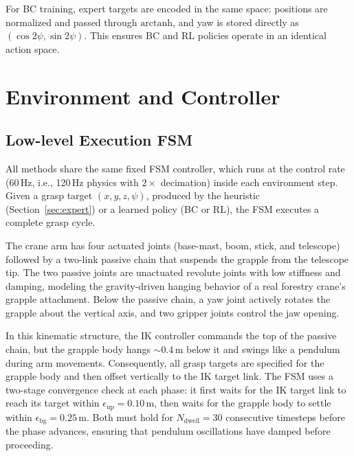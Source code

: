 \documentclass[conference]{IEEEtran}
\begin{document}
For BC training, expert targets are encoded in the same space: positions are normalized and passed through $\mathrm{arctanh}$, and yaw is stored directly as $(\cos 2\psi, \sin 2\psi)$.
This ensures BC and RL policies operate in an identical action space.

\section{Environment and Controller}
\subsection{Low-level Execution FSM}
All methods share the same fixed FSM controller, which runs at the control rate (60\,Hz, i.e., 120\,Hz physics with $2\times$ decimation) inside each environment step.
Given a grasp target $(x,y,z,\psi)$, produced by the heuristic (Section~\ref{sec:expert}) or a learned policy (BC or RL), the FSM executes a complete grasp cycle.

The crane arm has four actuated joints (base-mast, boom, stick, and telescope) followed by a two-link passive chain that suspends the grapple from the telescope tip.
The two passive joints are unactuated revolute joints with low stiffness and damping, modeling the gravity-driven hanging behavior of a real forestry crane's grapple attachment.
Below the passive chain, a yaw joint actively rotates the grapple about the vertical axis, and two gripper joints control the jaw opening.

In this kinematic structure, the IK controller commands the top of the passive chain, but the grapple body hangs $\sim$0.4\,m below it and swings like a pendulum during arm movements.
Consequently, all grasp targets are specified for the grapple body and then offset vertically to the IK target link.
The FSM uses a two-stage convergence check at each phase: it first waits for the IK target link to reach its target within $\epsilon_{\text{up}} = 0.10$\,m, then waits for the grapple body to settle within $\epsilon_{\text{bg}} = 0.25$\,m.
Both must hold for $N_{\text{dwell}} = 30$ consecutive timesteps before the phase advances, ensuring that pendulum oscillations have damped before proceeding.
\end{document}
